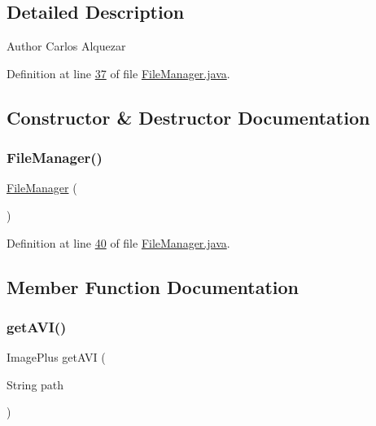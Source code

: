 \subsection{Detailed Description}
\begin{DoxyAuthor}{Author}
Carlos Alquezar 
\end{DoxyAuthor}


Definition at line \hyperlink{_file_manager_8java_source_l00037}{37} of file \hyperlink{_file_manager_8java_source}{File\+Manager.\+java}.



\subsection{Constructor \& Destructor Documentation}
\hypertarget{classfunctions_1_1_file_manager_a0ad324c611d51ae061bcf3105c84aef0}{}\label{classfunctions_1_1_file_manager_a0ad324c611d51ae061bcf3105c84aef0} 
\subsubsection{\texorpdfstring{File\+Manager()}{FileManager()}}
{\footnotesize\ttfamily \hyperlink{classfunctions_1_1_file_manager}{File\+Manager} (\begin{DoxyParamCaption}{ }\end{DoxyParamCaption})}



Definition at line \hyperlink{_file_manager_8java_source_l00040}{40} of file \hyperlink{_file_manager_8java_source}{File\+Manager.\+java}.



\subsection{Member Function Documentation}
\hypertarget{classfunctions_1_1_file_manager_a140fc635f053a614aecddfb79baf5905}{}\label{classfunctions_1_1_file_manager_a140fc635f053a614aecddfb79baf5905} 
\subsubsection{\texorpdfstring{get\+A\+V\+I()}{getAVI()}}
{\footnotesize\ttfamily Image\+Plus get\+A\+VI (\begin{DoxyParamCaption}\item[{String}]{path }\end{DoxyParamCaption})}


